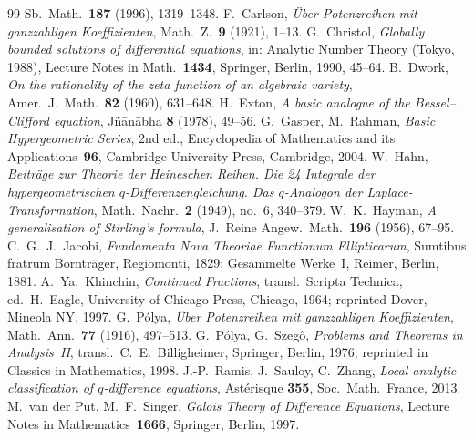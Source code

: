 \documentclass[11pt]{article}
\theoremstyle{plain}
\theoremstyle{definition}
\theoremstyle{remark}
\begin{document}
\begin{thebibliography}{99}
Sb.\ Math.\ \textbf{187} (1996), 1319--1348.
 F.~Carlson, \emph{\"Uber Potenzreihen mit ganzzahligen Koeffizienten},
Math.\ Z.\ \textbf{9} (1921), 1--13.
 G.~Christol, \emph{Globally bounded solutions of differential equations}, in:
Analytic Number Theory (Tokyo, 1988), Lecture Notes in Math.\ \textbf{1434}, Springer, Berlin, 1990,
45--64.
 B.~Dwork, \emph{On the rationality of the zeta function of an algebraic variety},
Amer.\ J.\ Math.\ \textbf{82} (1960), 631--648.
 H.~Exton, \emph{A basic analogue of the Bessel--Clifford equation},
J\~n\=an\=abha \textbf{8} (1978), 49--56.
 G.~Gasper, M.~Rahman, \emph{Basic Hypergeometric Series}, 2nd ed., Encyclopedia of
Mathematics and its Applications~\textbf{96}, Cambridge University Press, Cambridge, 2004.
 W.~Hahn, \emph{Beitr\"age zur Theorie der Heineschen Reihen. Die 24 Integrale der
hypergeometrischen $q$-Differenzengleichung. Das $q$-Analogon der Laplace-Transformation},
Math.\ Nachr.\ \textbf{2} (1949), no.~6, 340--379.
 W.~K.~Hayman, \emph{A generalisation of Stirling's formula},
J.~Reine Angew.\ Math.\ \textbf{196} (1956), 67--95.
 C.~G.~J.~Jacobi, \emph{Fundamenta Nova Theoriae Functionum Ellipticarum},
Sumtibus fratrum Borntr\"ager, Regiomonti, 1829; Gesammelte Werke~I, Reimer, Berlin, 1881.
 A.~Ya.~Khinchin, \emph{Continued Fractions}, transl.\ Scripta Technica,
ed.\ H.~Eagle, University of Chicago Press, Chicago, 1964; reprinted Dover, Mineola NY, 1997.
 G.~P\'olya, \emph{\"Uber Potenzreihen mit ganzzahligen Koeffizienten},
Math.\ Ann.\ \textbf{77} (1916), 497--513.
 G.~P\'olya, G.~Szeg\H{o}, \emph{Problems and Theorems in Analysis~II},
transl.\ C.~E.~Billigheimer, Springer, Berlin, 1976; reprinted in Classics in Mathematics, 1998.
 J.-P.~Ramis, J.~Sauloy, C.~Zhang, \emph{Local analytic classification of
$q$-difference equations}, Ast\'erisque \textbf{355}, Soc.\ Math.\ France, 2013.
 M.~van der Put, M.~F.~Singer, \emph{Galois Theory of Difference Equations},
Lecture Notes in Mathematics~\textbf{1666}, Springer, Berlin, 1997.
\end{thebibliography}
\end{document}
